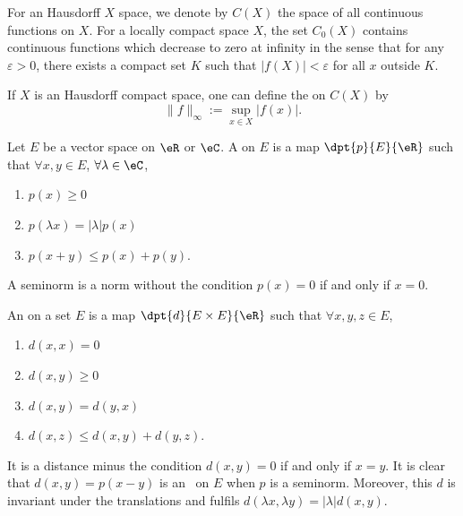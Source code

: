 For an Hausdorff $X$ space, we denote by $C(X)$\label{pg_def_Cz } the space of all continuous functions on $X$. For a locally compact space $X$, the set $C_0(X)$ contains continuous functions which decrease to zero at infinity in the sense that for any $\varepsilon>0$, there exists a compact set $K$ such that $|f(X)|<\varepsilon$ for all $x$ outside $K$.

\begin{definition}
	If $X$ is an Hausdorff compact space, one can define the  on $C(X)$ by
	\begin{equation}
		\|f\|_{\infty}:=\sup_{x\in X}|f(x)|.
	\end{equation}
	\label{def:sup_norm}
\end{definition}

\begin{definition}
	Let $E$ be a vector space on $\eR$ or $\eC$. A  on $E$ is a map $\dpt{p}{E}{\eR}$ such that $\forall x,y\in E$, $\forall\lambda\in\eC$,
	\begin{enumerate}
		\item $p(x)\geq 0$
		\item $p(\lambda x)=|\lambda|p(x)$
		\item $p(x+y)\leq p(x)+p(y)$.
	\end{enumerate}
\end{definition}
A seminorm is a norm without the condition  $p(x)=0$ if and only if $x=0$.

\begin{definition}
	An  on a set $E$ is a map $\dpt{d}{E\times E}{\eR}$ such that $\forall x,y,z\in E$,
	\begin{enumerate}
		\item $d(x,x)=0$
		\item $d(x,y)\geq 0$
		\item $d(x,y)=d(y,x)$
		\item $d(x,z)\leq d(x,y)+d(y,z)$.
	\end{enumerate}
\end{definition}
It is a distance minus the condition  $d(x,y)=0$ if and only if $x=y$.
It is clear that $d(x,y)=p(x-y)$ is an \ecart\ on $E$ when $p$ is a seminorm. Moreover, this $d$ is invariant under the translations and fulfils $d(\lambda x,\lambda y)=|\lambda|d(x,y)$.

